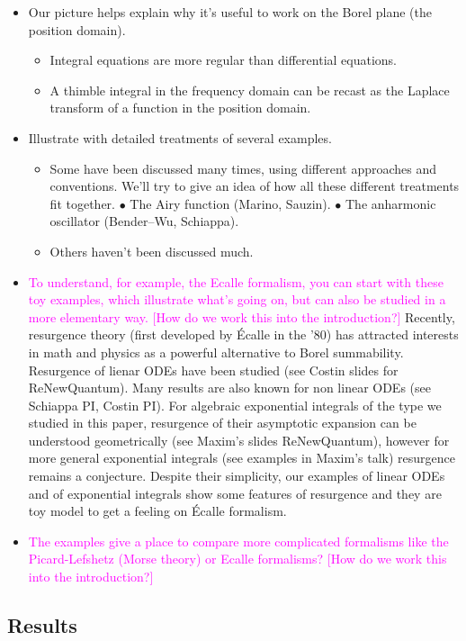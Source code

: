 \documentclass{article}
\begin{document}
\begin{itemize}
\item Our picture helps explain why it's useful to work on the Borel plane (the position domain).
\begin{itemize}
\item Integral equations are more regular than differential equations.
\item A thimble integral in the frequency domain can be recast as the Laplace transform of a function in the position domain.
\end{itemize}
\item Illustrate with detailed treatments of several examples.
\begin{itemize}
\item Some have been discussed many times, using different approaches and conventions. We'll try to give an idea of how all these different treatments fit together. $\bullet$ The Airy function (Marino, Sauzin). $\bullet$ The anharmonic oscillator (Bender--Wu, Schiappa).
\item Others haven't been discussed much.
\end{itemize}
\item \textcolor{magenta}{To understand, for example, the Ecalle formalism, you can start with these toy examples, which illustrate what's going on, but can also be studied in a more elementary way. [How do we work this into the introduction?]} Recently, resurgence theory (first developed by \'Ecalle in the '80) has attracted interests in math and physics as a powerful alternative to Borel summability. Resurgence of lienar ODEs have been studied (see Costin slides for ReNewQuantum). Many results are also known for non linear ODEs (see Schiappa PI, Costin PI). For algebraic exponential integrals of the type we studied in this paper, resurgence of their asymptotic expansion can be understood geometrically (see Maxim's slides ReNewQuantum), however for more general exponential integrals (see examples in Maxim's talk) resurgence remains a conjecture. Despite their simplicity, our examples of linear ODEs and of exponential integrals show some features of resurgence and they are toy model to get a feeling on \'Ecalle formalism.       
\item \textcolor{magenta}{The examples give a place to compare more complicated formalisms like the Picard-Lefshetz (Morse theory) or Ecalle formalisms? [How do we work this into the introduction?]}
\end{itemize}
\subsection{Results}
\end{document}
